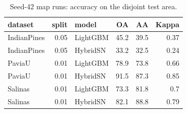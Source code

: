 \begin{table}
\caption{Seed-42 map runs: accuracy on the disjoint test area.}
\label{tab:table_maps}
\begin{tabular}{lrlrrr}
\toprule
dataset & split & model & OA & AA & Kappa \\
\midrule
IndianPines & 0.05 & LightGBM & 45.2 & 39.5 & 0.37 \\
IndianPines & 0.05 & HybridSN & 33.2 & 32.5 & 0.24 \\
PaviaU & 0.01 & LightGBM & 78.9 & 73.8 & 0.66 \\
PaviaU & 0.01 & HybridSN & 91.5 & 87.3 & 0.85 \\
Salinas & 0.01 & LightGBM & 73.3 & 81.8 & 0.7 \\
Salinas & 0.01 & HybridSN & 82.1 & 88.8 & 0.79 \\
\bottomrule
\end{tabular}
\end{table}
